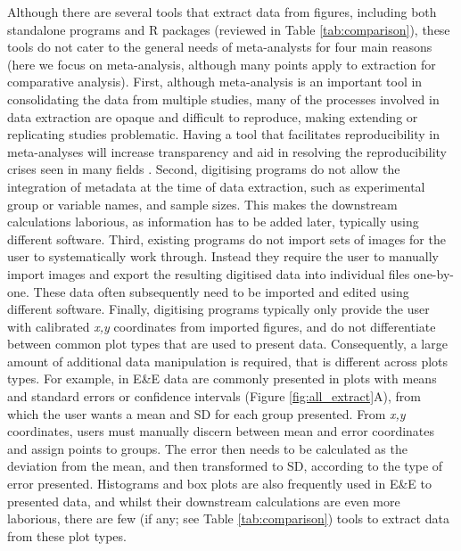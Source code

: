 \documentclass[12pt]{article}
\let\proglang=\textsf
\begin{document}
Although there are several tools that extract data from figures, including both standalone programs and \proglang{R} packages (reviewed in Table \ref{tab:comparison}), these tools do not cater to the general needs of meta-analysts for four main reasons (here we focus on meta-analysis, although many points apply to extraction for comparative analysis). 
%
 First, although meta-analysis is an important tool in consolidating the data from multiple studies, many of the processes involved in data extraction are opaque and difficult to reproduce, making extending or replicating studies problematic. Having a tool that facilitates reproducibility in meta-analyses will increase transparency and aid in resolving the reproducibility crises seen in many fields \citep{peng_reproducible_2006, peng_reproducible_2011, Parker2016}.
%
 Second, digitising programs do not allow the integration of metadata at the time of data extraction, such as experimental group or variable names, and sample sizes. This makes the downstream calculations laborious, as information has to be added later, typically using different software. %
%
 Third, existing programs do not import sets of images for the user to systematically work through. Instead they require the user to manually import images and export the resulting digitised data into individual files one-by-one. These data often subsequently need to be imported and edited using different software. 
%
 Finally, digitising programs typically only provide the user with calibrated \textit{x,y} coordinates from imported figures, and do not differentiate between common plot types that are used to present data. Consequently, a large amount of additional data manipulation is required, that is different across plots types. For example, in E\&E data are commonly presented in plots with means and standard errors or confidence intervals (Figure \ref{fig:all_extract}A), from which the user wants a mean and SD for each group presented. From \textit{x,y} coordinates, users must manually discern between mean and error coordinates and assign points to groups. The error then needs to be calculated as the deviation from the mean, and then transformed to SD, according to the type of error presented. Histograms and box plots are also frequently used in E\&E to presented data, and whilst their downstream calculations are even more laborious, there are few (if any; see Table \ref{tab:comparison}) tools to extract data from these plot types.
\end{document}
